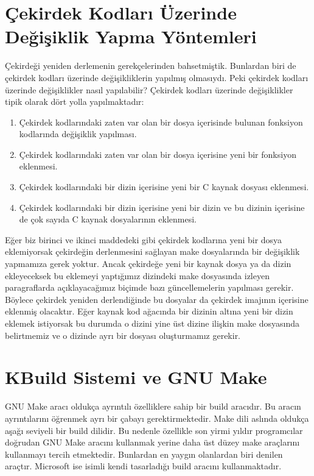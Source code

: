 \documentclass[a4paper,10pt,turkish]{sphinxmanual}
\begin{document}
\section{Çekirdek Kodları Üzerinde Değişiklik Yapma Yöntemleri}
\label{\detokenize{kernelcompilation:cekirdek-kodlari-uzerinde-degisiklik-yapma-yontemleri}}
\sphinxAtStartPar
Çekirdeği yeniden derlemenin gerekçelerinden bahsetmiştik. Bunlardan biri de çekirdek kodları üzerinde
değişikliklerin yapılmış olmasıydı. Peki çekirdek kodları üzerinde değişiklikler nasıl yapılabilir?
Çekirdek kodları üzerinde değişiklikler tipik olarak dört yolla yapılmaktadır:
\begin{enumerate}
%
\item {} 
\sphinxAtStartPar
Çekirdek kodlarındaki zaten var olan bir dosya içerisinde bulunan fonksiyon kodlarında değişiklik
yapılması.

\item {} 
\sphinxAtStartPar
Çekirdek kodlarındaki zaten var olan bir dosya içerisine yeni bir fonksiyon eklenmesi.

\item {} 
\sphinxAtStartPar
Çekirdek kodlarındaki bir dizin içerisine yeni bir C kaynak dosyası eklenmesi.

\item {} 
\sphinxAtStartPar
Çekirdek kodlarındaki bir dizin içerisine yeni bir dizin ve bu dizinin içerisine de çok sayıda C
kaynak dosyalarının eklenmesi.

\end{enumerate}

\sphinxAtStartPar
Eğer biz birinci ve ikinci maddedeki gibi çekirdek kodlarına yeni bir dosya eklemiyorsak çekirdeğin
derlenmesini sağlayan make dosyalarında bir değişiklik yapmamıza gerek yoktur. Ancak çekirdeğe yeni bir
kaynak dosya ya da dizin ekleyeceksek bu eklemeyi yaptığımız dizindeki make dosyasında izleyen paragraflarda
açıklayacağımız biçimde bazı güncellemelerin yapılması gerekir. Böylece çekirdek yeniden derlendiğinde bu
dosyalar da çekirdek imajının içerisine eklenmiş olacaktır. Eğer kaynak kod ağacında bir dizinin altına yeni
bir dizin eklemek istiyorsak bu durumda o dizini yine üst dizine ilişkin make dosyasında belirtmemiz ve o
dizinde ayrı bir  dosyası oluşturmamız gerekir.


\section{KBuild Sistemi ve GNU Make}
\label{\detokenize{kernelcompilation:kbuild-sistemi-ve-gnu-make}}
\sphinxAtStartPar
GNU Make aracı oldukça ayrıntılı özelliklere sahip bir build aracıdır. Bu aracın ayrıntılarını öğrenmek
ayrı bir çabayı gerektirmektedir. Make dili aslında oldukça aşağı seviyeli bir build dilidir. Bu nedenle
özellikle son yirmi yıldır programcılar doğrudan GNU Make aracını kullanmak yerine daha üst düzey make
araçlarını kullanmayı tercih etmektedir. Bunlardan en yaygın olanlardan biri  denilen araçtır.
Microsoft ise  isimli kendi tasarladığı build aracını kullanmaktadır.
\end{document}

